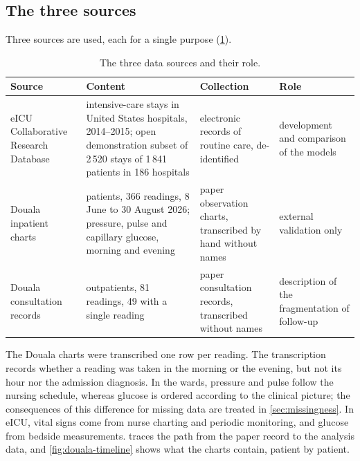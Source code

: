 \subsection{The three sources}

Three sources are used, each for a single purpose (\cref{tab:datasets}).

\begin{table}[htbp]
\centering\footnotesize
\caption{The three data sources and their role.}\label{tab:datasets}
\begin{tabularx}{\textwidth}{@{}>{\raggedright\arraybackslash}p{2.8cm} >{\raggedright\arraybackslash}X >{\raggedright\arraybackslash}p{3.0cm} >{\raggedright\arraybackslash}p{2.6cm}@{}}
\toprule
\textbf{Source} & \textbf{Content} & \textbf{Collection} & \textbf{Role} \\
\midrule
eICU Collaborative Research Database \parencite{pollard2018,eicudemo} & intensive-care stays in United States hospitals, 2014--2015; open demonstration subset of 2\,520 stays of 1\,841 patients in 186 hospitals & electronic records of routine care, de-identified & development and comparison of the models \\
Douala inpatient charts & 32 patients, 366 readings, 8 June to 30 August 2026; pressure, pulse and capillary glucose, morning and evening & paper observation charts, transcribed by hand without names & external validation only \\
Douala consultation records & 58 outpatients, 81 readings, 49 with a single reading & paper consultation records, transcribed without names & description of the fragmentation of follow-up \\
\bottomrule
\end{tabularx}
\end{table}

The Douala charts were transcribed one row per reading. The transcription records whether a reading was taken in the morning or the evening, but not its hour nor the admission diagnosis. In the wards, pressure and pulse follow the nursing schedule, whereas glucose is ordered according to the clinical picture; the consequences of this difference for missing data are treated in \cref{sec:missingness}. In eICU, vital signs come from nurse charting and periodic monitoring, and glucose from bedside measurements.  traces the path from the paper record to the analysis data, and \cref{fig:douala-timeline} shows what the charts contain, patient by patient.

